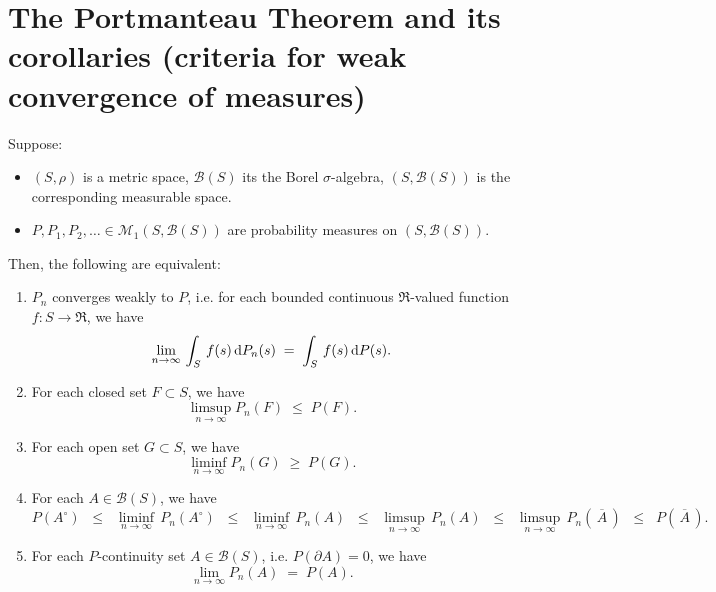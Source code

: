 

\section{The Portmanteau Theorem and its corollaries (criteria for weak convergence of measures)}
\setcounter{theorem}{0}
\setcounter{equation}{0}

\renewcommand{\theenumi}{\roman{enumi}}
\renewcommand{\labelenumi}{\textnormal{(\theenumi)}$\;\;$}

\begin{theorem}
\label{PortmanteauTheorem}
\mbox{}\vskip 0.2cm
\noindent
Suppose:
\begin{itemize}
\item	$\left(S,\rho\right)$ is a metric space, $\mathcal{B}(S)$ its the Borel $\sigma$-algebra,
		$\left(S,\mathcal{B}(S)\right)$ is the corresponding measurable space.
\item	$P, P_{1}, P_{2}, \ldots \in \mathcal{M}_{1}\!\left(S,\mathcal{B}(S)\right)$
		are probability measures on $\left(S,\mathcal{B}(S)\right)$.
\end{itemize}
Then, the following are equivalent:
\begin{enumerate}
\item	$P_{n}$ converges weakly to $P$,
		i.e. for each bounded continuous $\Re$-valued function $f : S \longrightarrow \Re$, we have
		\begin{equation*}
		\lim_{n\rightarrow\infty}\,\int_{S}\,f(s)\,\textnormal{d} P_{n}(s) \;=\; \int_{S}\,f(s)\,\textnormal{d} P(s).
		\end{equation*}
\item	For each closed set $F \subset S$, we have
		\begin{equation*}
		\limsup_{n\rightarrow\infty}P_{n}(F) \;\leq\; P(F).
		\end{equation*}
\item	For each open set $G \subset S$, we have
		\begin{equation*}
		\liminf_{n\rightarrow\infty}P_{n}(G) \;\geq\; P(G).
		\end{equation*}
\item	For each $A \in \mathcal{B}(S)$, we have
		\begin{equation*}
		P\!\left(A^{\circ}\right)
		\;\;\leq\;\; \liminf_{n\rightarrow\infty}\,P_{n}\!\left(A^{\circ}\right)
		\;\;\leq\;\; \liminf_{n\rightarrow\infty}\,P_{n}\!\left(A\right)
		\;\;\leq\;\; \limsup_{n\rightarrow\infty}\,P_{n}\!\left(A\right)
		\;\;\leq\;\; \limsup_{n\rightarrow\infty}\,P_{n}\!\left(\,\overline{A}\,\right)
		\;\;\leq\;\; P\!\left(\,\overline{A}\,\right).
		\end{equation*}
\item	For each $P$-continuity set $A \in \mathcal{B}(S)$, i.e. $P(\partial A) = 0$, we have
		\begin{equation*}
		\lim_{n\rightarrow\infty}P_{n}(A) \;=\; P(A).
		\end{equation*}
\end{enumerate}
\end{theorem}

